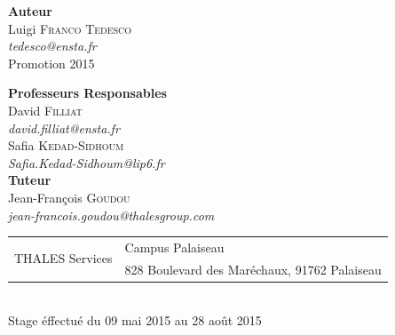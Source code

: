 \begin{titlepage}
\begin{center}
		\begin{minipage}{0.4\textwidth}
			\begin{flushleft} \large
				\textbf{Auteur}\\
				Luigi \textsc{Franco Tedesco}\\
				      \textit{tedesco@ensta.fr}\\
				Promotion 2015
			\end{flushleft}
		\end{minipage}
		\begin{minipage}{0.55\textwidth}
			\begin{flushright} \large
				\textbf{Professeurs Responsables} \\
				David \textsc{Filliat} \\
				\textit{david.filliat@ensta.fr}\\[0.1cm]
				Safia \textsc{Kedad-Sidhoum} \\
				\textit{Safia.Kedad-Sidhoum@lip6.fr}\\[0.3cm]
				\textbf{Tuteur} \\
				Jean-François \textsc{Goudou} \\
				\textit{jean-francois.goudou@thalesgroup.com}\\
			\end{flushright}
		\end{minipage}

		\vfill

		\begin{tabular}{r|l}
			\multirow{2}{*}{THALES Services}& Campus Palaiseau\\
			       & 828 Boulevard des Maréchaux, 91762 Palaiseau 
		\end{tabular}\\[1cm]
		Stage éffectué du 09 mai 2015 au 28 août 2015\\[0.2cm]
	\end{center}

\end{titlepage}


